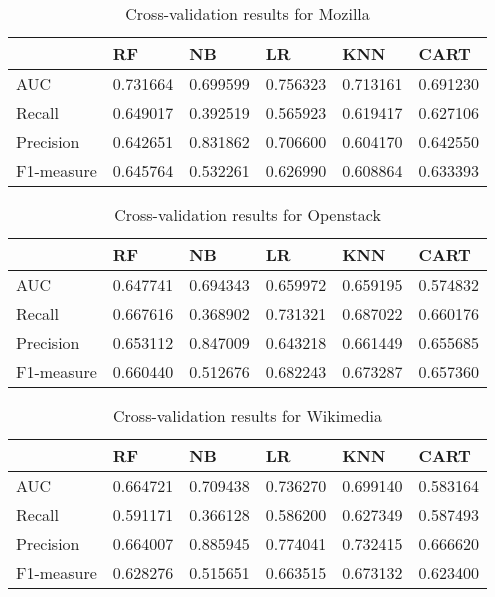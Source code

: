 \begin{table}[h]
  \caption{Cross-validation results for Mozilla}
  \label{table:mozilla-models}
    \centering
    \begin{tabular}{|l|l|l|l|l|l|}
    \hline
        ~ & RF & NB & LR & KNN & CART \\ \hline
        AUC & 0.731664 & 0.699599 & 0.756323 & 0.713161 & 0.691230 \\ \hline
        Recall & 0.649017 & 0.392519 & 0.565923 & 0.619417 & 0.627106 \\ \hline
        Precision & 0.642651 & 0.831862 & 0.706600 & 0.604170 & 0.642550 \\ \hline
        F1-measure & 0.645764 & 0.532261 & 0.626990 & 0.608864 & 0.633393 \\ \hline
    \end{tabular}
\end{table}

\begin{table}[h]
  \caption{Cross-validation results for Openstack}
  \label{table:openstack-models}
    \centering
    \begin{tabular}{|l|l|l|l|l|l|}
    \hline
        ~ & RF & NB & LR & KNN & CART \\ \hline
        AUC & 0.647741 & 0.694343 & 0.659972 & 0.659195 & 0.574832 \\ \hline
        Recall & 0.667616 & 0.368902 & 0.731321 & 0.687022 & 0.660176 \\ \hline
        Precision & 0.653112 & 0.847009 & 0.643218 & 0.661449 & 0.655685 \\ \hline
        F1-measure & 0.660440 & 0.512676 & 0.682243 & 0.673287 & 0.657360 \\ \hline
    \end{tabular}
\end{table}

\begin{table}[h]
  \caption{Cross-validation results for Wikimedia}
  \label{table:wikimedia-models}
    \centering
    \begin{tabular}{|l|l|l|l|l|l|}
    \hline
        ~ & RF & NB & LR & KNN & CART \\ \hline
        AUC & 0.664721 & 0.709438 & 0.736270 & 0.699140 & 0.583164 \\ \hline
        Recall & 0.591171 & 0.366128 & 0.586200 & 0.627349 & 0.587493 \\ \hline
        Precision & 0.664007 & 0.885945 & 0.774041 & 0.732415 & 0.666620 \\ \hline
        F1-measure & 0.628276 & 0.515651 & 0.663515 & 0.673132 & 0.623400 \\ \hline
    \end{tabular}
\end{table}

